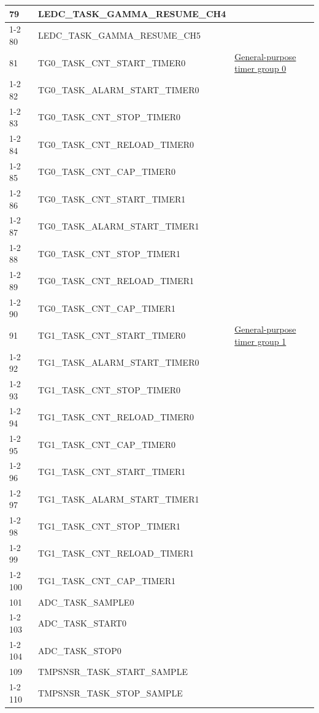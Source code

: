 \documentclass[main\_\_EN.tex]{subfiles}
\begin{document}
\begin{longtable}{ | l | l | l | }
79  & LEDC\_TASK\_GAMMA\_RESUME\_CH4& \\ \cline{1-2}
80  & LEDC\_TASK\_GAMMA\_RESUME\_CH5& \\ \hline
81  & TG0\_TASK\_CNT\_START\_TIMER0     & \hyperref[mod:timg]{General-purpose timer group 0}\\ \cline{1-2}
82  & TG0\_TASK\_ALARM\_START\_TIMER0   & \\ \cline{1-2}
83  & TG0\_TASK\_CNT\_STOP\_TIMER0      & \\ \cline{1-2}
84  & TG0\_TASK\_CNT\_RELOAD\_TIMER0    & \\ \cline{1-2}
85  & TG0\_TASK\_CNT\_CAP\_TIMER0       & \\ \cline{1-2}
86  & TG0\_TASK\_CNT\_START\_TIMER1     & \\ \cline{1-2}
87  & TG0\_TASK\_ALARM\_START\_TIMER1   & \\ \cline{1-2}
88 & TG0\_TASK\_CNT\_STOP\_TIMER1      & \\ \cline{1-2}
89 & TG0\_TASK\_CNT\_RELOAD\_TIMER1    & \\ \cline{1-2}
90 & TG0\_TASK\_CNT\_CAP\_TIMER1       & \\ \hline
91 & TG1\_TASK\_CNT\_START\_TIMER0     & \hyperref[mod:timg]{General-purpose timer group 1}\\ \cline{1-2}
92 & TG1\_TASK\_ALARM\_START\_TIMER0   & \\ \cline{1-2}
93 & TG1\_TASK\_CNT\_STOP\_TIMER0      & \\ \cline{1-2}
94 & TG1\_TASK\_CNT\_RELOAD\_TIMER0    & \\ \cline{1-2}
95 & TG1\_TASK\_CNT\_CAP\_TIMER0       & \\ \cline{1-2}
96 & TG1\_TASK\_CNT\_START\_TIMER1     & \\ \cline{1-2}
97 & TG1\_TASK\_ALARM\_START\_TIMER1   & \\ \cline{1-2}
98 & TG1\_TASK\_CNT\_STOP\_TIMER1      & \\ \cline{1-2}
99 & TG1\_TASK\_CNT\_RELOAD\_TIMER1    & \\ \cline{1-2}
100 & TG1\_TASK\_CNT\_CAP\_TIMER1       & \\ \hline
101 & ADC\_TASK\_SAMPLE0     & \nameref{mod:adc}   \\ \cline{1-2}
103 & ADC\_TASK\_START0      & \\ \cline{1-2}
104 & ADC\_TASK\_STOP0& \\ \hline
109 & TMPSNSR\_TASK\_START\_SAMPLE  & \nameref{mod:tmpsen}      \\ \cline{1-2}
110 & TMPSNSR\_TASK\_STOP\_SAMPLE   & \\ \hline

\end{longtable}
\end{document}

